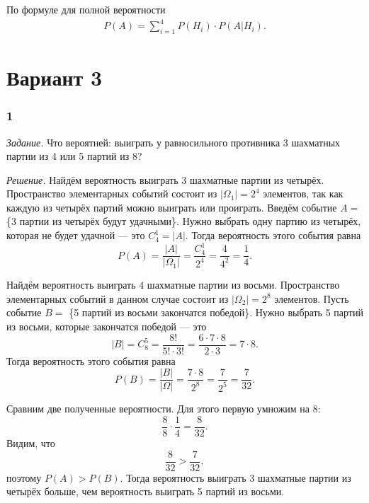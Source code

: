 По формуле для полной вероятности
\begin{equation*}
\begin{split}
P \left( A \right) =
\sum \limits_{i=1}^4 P \left( H_i \right) \cdot P \left( \left. A \right| H_i \right).
\end{split}
\end{equation*}

\section*{Вариант 3}

\subsubsection*{1}

\textit{Задание.} Что вероятней: выиграть у равносильного противника 3 шахматных партии из 4 или 5 партий из 8?

\textit{Решение.} Найдём вероятность выиграть 3 шахматные партии из четырёх.
Пространство элементарных событий состоит из $ \left| \Omega_1 \right| = 2^4$ элементов,
так как каждую из четырёх партий можно выиграть или проиграть.
Введём событие $A =$ \{3 партии из четырёх будут удачными\}.
Нужно выбрать одну партию из четырёх, которая не будет удачной --- это $C_4^1 = \left| A \right| $.
Тогда вероятность этого события равна
$$P \left( A \right) =
\frac{ \left| A \right| }{ \left| \Omega_1 \right| } =
\frac{C_4^1}{2^4} =
\frac{4}{4^2} =
\frac{1}{4}.$$

Найдём вероятность выиграть 4 шахматные партии из восьми.
Пространство элементарных событий в данном случае состоит из $ \left| \Omega_2 \right| = 2^8$ элементов.
Пусть событие $B =$ \{5 партий из восьми закончатся победой\}.
Нужно выбрать 5 партий из восьми, которые закончатся победой --- это
$$ \left| B \right| =
C_8^5 =
\frac{8!}{5! \cdot 3!} =
\frac{6 \cdot 7 \cdot 8}{2 \cdot 3} =
7 \cdot 8.$$
Тогда вероятность этого события равна
$$P \left( B \right) =
\frac{ \left| B \right| }{ \left| \Omega \right| } =
\frac{7  \cdot 8}{2^8} =
\frac{7}{2^5} =
\frac{7}{32}.$$

Сравним две полученные вероятности.
Для этого первую умножим на 8:
$$ \frac{8}{8} \cdot \frac{1}{4} =
\frac{8}{32}.$$
Видим, что
$$ \frac{8}{32} > \frac{7}{32},$$
поэтому $P \left( A \right) > P \left( B \right) $.
Тогда вероятность выиграть 3 шахматные партии из четырёх больше, чем вероятность выиграть 5 партий из восьми.

